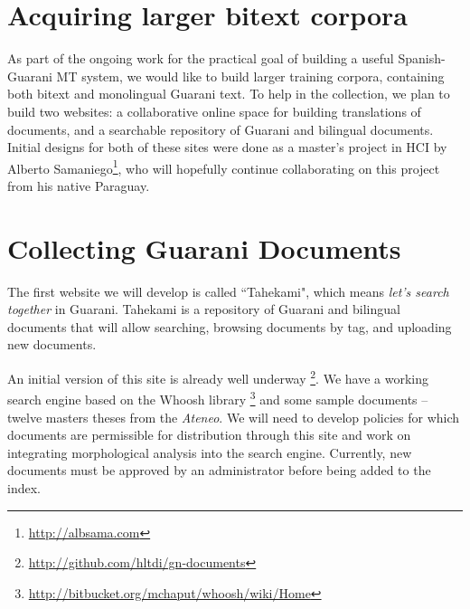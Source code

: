 

\section{Acquiring larger bitext corpora}
\label{sec:crowdsourcing}
As part of the ongoing work for the practical goal of building a useful
Spanish-Guarani MT system, we would like to build larger training corpora,
containing both bitext and monolingual Guarani text.
To help in the collection, we plan to build two websites:
a collaborative online space for building translations of documents, 
and a searchable repository of Guarani and bilingual documents.
Initial designs for both of these sites were done as a master's project in HCI
by Alberto Samaniego\footnote{\url{http://albsama.com}}, who will hopefully
continue collaborating on this project from his native Paraguay.

\section{Collecting Guarani Documents}
The first website we will develop is called ``Tahekami", which means
\emph{let's search together} in Guarani.
Tahekami is a repository of Guarani and bilingual documents that will allow
searching, browsing documents by tag, and uploading new documents.

An initial version of this site is already well underway
\footnote{\url{http://github.com/hltdi/gn-documents}}.  We have a working
search engine based on the Whoosh library
\footnote{\url{http://bitbucket.org/mchaput/whoosh/wiki/Home}} and some sample
documents -- twelve masters theses from the \emph{Ateneo}. We will need to
develop policies for which documents are permissible for distribution through
this site and work on integrating morphological analysis into the search
engine. Currently, new documents must be approved by an administrator before
being added to the index.

